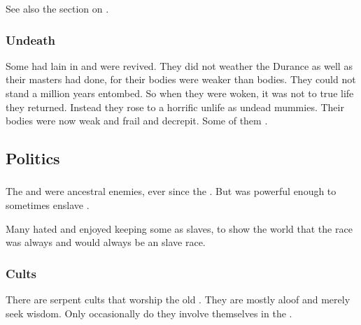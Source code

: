 See also the section on . 





\subsubsection{Undeath}
Some \ophidians had lain in  and were revived.
They did not weather the Durance as well as their \draconian masters had done, for their \ophidian bodies were weaker than \draconian bodies.
They could not stand a million years entombed. 
So when they were woken, it was not to true life they returned.
Instead they rose to a horrific unlife as undead mummies. 
Their bodies were now weak and frail and decrepit. 
Some of them .









\subsection{Politics}





\subsubsection{\Aryothim}
The \ophidians and \aryothim were ancestral enemies, ever since the .
But  was powerful enough to sometimes enslave \aryothim. 

Many \ophidians hated \aryothim and enjoyed keeping some \aryothim as slaves, to show the world that the \aryoth race was always and would always be an \ophidian slave race. 





\subsubsection{Cults}
There are serpent cults that worship the old \ophidians. 
They are mostly aloof and merely seek wisdom. 
Only occasionally do they involve themselves in the \feud. 





